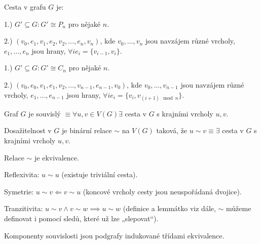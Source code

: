 \documentclass[12pt]{article}					%
\begin{document}
    \begin{definice}
        Cesta v grafu $G$ je:

        1.) $G' \subseteq G: G' \cong P_n$ pro nějaké $n$.

        2.) $(v_0, e_1, v_1, e_2, v_2, …, e_n, v_n)$, kde $v_0, …, v_n$ jsou navzájem různé vrcholy, $e_1, …, e_n$ jsou hrany, $\forall i e_i = \{v_{i-1}, v_i\}$.
    \end{definice}

    \begin{definice}
    

        1.) $G' \subseteq G: G' \cong C_n$ pro nějaké $n$.

        2.) $(v_0, e_0, v_1, e_1, v_2, …, v_{n-1}, e_{n-1}, v_0)$, kde $v_0, …, v_{n-1}$ jsou navzájem různé vrcholy, $e_1, …, e_{n-1}$ jsou hrany, $\forall i e_i = \{v_{i}, v_{(i+1) \mod n}\}$.
    \end{definice}

    \begin{definice}
        Graf $G$ je souvislý $≡ \forall u, v \in V(G) \exists$ cesta v $G$ s krajními vrcholy $u, v$.
    \end{definice}

    \begin{definice}[Dosažitelnost]
        Dosažitelnost v $G$ je binární relace $\sim$ na $V(G)$ taková, že $u \sim v ≡ \exists$ cesta v $G$ s krajními vrcholy $u, v$.
    \end{definice}

    \begin{lemma}
        Relace $\sim$ je ekvivalence.
        \begin{dukazin}
            Reflexivita: $u \sim u$ (existuje triviální cesta).

            Symetrie: $u \sim v \Leftarrow v \sim u$ (koncové vrcholy cesty jsou neuspořádaná dvojice).

            Tranzitivita: $u \sim v \land v \sim w \implies u \sim w$ (definice a lemmátko viz dále, $\sim$ můžeme definovat i pomocí sledů, které už lze „slepovat“).
        \end{dukazin}
    \end{lemma}

    \begin{definice}
        Komponenty souvislosti jsou podgrafy indukované třídami ekvivalence.
    \end{definice}
\end{document}
